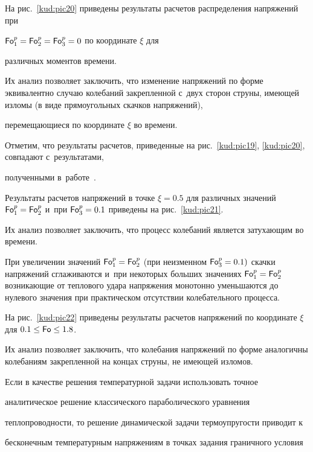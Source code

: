 На рис.~\ref{kud:pic20} приведены результаты расчетов распределения напряжений при

$\operatorname{\sf Fo}_1^p =\operatorname{\sf Fo}_2^p =\operatorname{\sf Fo}_3^p =0$ по координате $\xi$ для

различных моментов времени. 

Их анализ позволяет заключить, что изменение напряжений по форме эквивалентно случаю колебаний закрепленной с~двух сторон струны, имеющей изломы (в виде прямоугольных скачков напряжений),

перемещающиеся по координате $\xi$ во времени. 

Отметим, что результаты расчетов, приведенные на рис.~\ref{kud:pic19}, \ref{kud:pic20}, совпадают с~результатами,

полученными в~работе~\cite{kud:bib21}.



Результаты расчетов напряжений в точке $\xi=0.5$ для различных значений $\operatorname{\sf Fo}_1^p =\operatorname{\sf Fo}_2^p $  и~при $\operatorname{\sf Fo}_3^p =0.1$ приведены на рис.~\ref{kud:pic21}. 

Их анализ позволяет заключить, что процесс колебаний является затухающим во времени. 

При увеличении значений $\operatorname{\sf Fo}_1^p =\operatorname{\sf Fo}_2^p$ (при неизменном $\operatorname{\sf Fo}_3^p =0.1)$ скачки напряжений сглаживаются и~при некоторых больших значениях $\operatorname{\sf Fo}_1^p =\operatorname{\sf Fo}_2^p$ возникающие от теплового удара напряжения монотонно уменьшаются до нулевого значения при практическом отсутствии колебательного процесса.



На рис.~\ref{kud:pic22} приведены результаты расчетов напряжений по координате $\xi$ для $0.1\le \operatorname{\sf Fo} \le 1.8$. 

Их анализ позволяет заключить, что колебания напряжений по форме аналогичны колебаниям закрепленной на концах струны, не имеющей изломов.







Если в качестве решения температурной задачи использовать точное

аналитическое решение классического параболического уравнения

теплопроводности, то решение динамической задачи термоупругости приводит к

бесконечным температурным напряжениям в точках задания граничного условия

